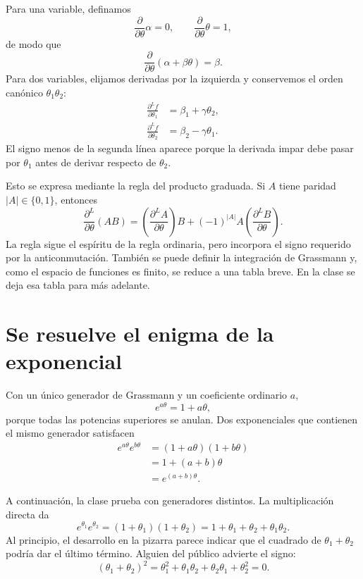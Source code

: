 Para una variable, definamos
\begin{equation}
\frac{\partial}{\partial\theta}\alpha=0,
\qquad
\frac{\partial}{\partial\theta}\theta=1,
\end{equation}
de modo que
\begin{equation}
\frac{\partial}{\partial\theta}
(\alpha+\beta\theta)=\beta.
\end{equation}
Para dos variables, elijamos derivadas por la izquierda y conservemos el orden canónico \(\theta_1\theta_2\):
\begin{align}
\frac{\partial^L f}{\partial\theta_1}
&=\beta_1+\gamma\theta_2,\\
\frac{\partial^L f}{\partial\theta_2}
&=\beta_2-\gamma\theta_1.
\end{align}
El signo menos de la segunda línea aparece porque la derivada impar debe pasar por \(\theta_1\) antes de derivar respecto de \(\theta_2\).

Esto se expresa mediante la regla del producto graduada. Si \(A\) tiene paridad \(|A|\in\{0,1\}\), entonces
\begin{equation}
\frac{\partial^L}{\partial\theta}(AB)
=\left(\frac{\partial^L A}{\partial\theta}\right)B
+(-1)^{|A|}A
\left(\frac{\partial^L B}{\partial\theta}\right).
\end{equation}
La regla sigue el espíritu de la regla ordinaria, pero incorpora el signo requerido por la anticonmutación. También se puede definir la integración de Grassmann y, como el espacio de funciones es finito, se reduce a una tabla breve. En la clase se deja esa tabla para más adelante.

\section{Se resuelve el enigma de la exponencial}

Con un único generador de Grassmann y un coeficiente ordinario \(a\),
\begin{equation}
e^{a\theta}
=1+a\theta,
\end{equation}
porque todas las potencias superiores se anulan. Dos exponenciales que contienen el mismo generador satisfacen
\begin{align}
e^{a\theta}e^{b\theta}
&=(1+a\theta)(1+b\theta)\\
&=1+(a+b)\theta\\
&=e^{(a+b)\theta}.
\end{align}

A continuación, la clase prueba con generadores distintos. La multiplicación directa da
\begin{equation}
e^{\theta_1}e^{\theta_2}
=(1+\theta_1)(1+\theta_2)
=1+\theta_1+\theta_2+\theta_1\theta_2.
\end{equation}
Al principio, el desarrollo en la pizarra parece indicar que el cuadrado de \(\theta_1+\theta_2\) podría dar el último término. Alguien del público advierte el signo:
\begin{equation}
(\theta_1+\theta_2)^2
=\theta_1^2+\theta_1\theta_2
 +\theta_2\theta_1+\theta_2^2
=0.
\end{equation}

